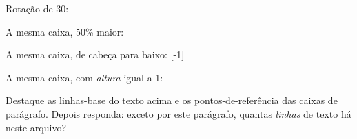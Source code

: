 \documentclass[a4paper,12pt]{article}
\begin{document}
	
		
	Rotação de \unit{30}{\degree}: 
	
	A mesma caixa, 50\% maior: \scalebox{1.5}{\usebox{\minhacaixa}}
	
	A mesma caixa, de cabeça para baixo: \scalebox{1}[-1]{\usebox{\minhacaixa}}
	
	A mesma caixa, com \emph{altura} igual a \unit{1}{\centi\metre}: \resizebox{!}{1cm}{\usebox{\minhacaixa}}
		
	Destaque as linhas-base do texto acima e os pontos-de-referência das caixas de parágrafo. Depois responda: exceto por este parágrafo, quantas \emph{linhas} de texto há neste arquivo?
	
\end{document}
